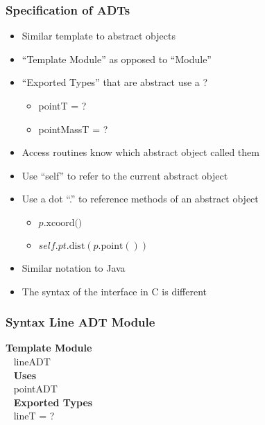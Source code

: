 \documentclass[t,12pt,numbers,fleqn,handout]{beamer}
\begin{document}
\begin{frame}
\frametitle{Specification of ADTs}
\begin{itemize}
\item Similar template to abstract objects
\item ``Template Module'' as opposed to ``Module''
\item ``Exported Types'' that are abstract use a ?
\begin{itemize}
\item pointT = ?
\item pointMassT = ?
\end{itemize}
\item Access routines know which abstract object called them
\item Use ``self'' to refer to the current abstract object
\item Use a dot ``.'' to reference methods of an abstract object
\begin{itemize}
\item $p.\mbox{xcoord()}$
\item $\mathit{self}.pt.\mbox{dist}(p.\mbox{point}())$
\end{itemize}
\item Similar notation to Java
\item The syntax of the interface in C is different
\end{itemize}
\end{frame}


\begin{frame}
\frametitle{Syntax Line ADT Module}

\textbf{Template Module}\\
~\newline
lineADT\\
~\newline
\textbf{Uses}\\
~\newline
pointADT\\
~\newline
\textbf{Exported Types}\\
~\newline
lineT = ?

\end{frame}

\end{document}
